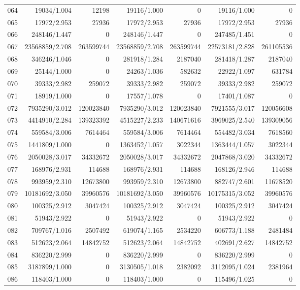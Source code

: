 \begin{longtable}{crrrrrr}
064 & 19034/1.004 & 12198 & 19116/1.000 & 0 & 19116/1.000 & 0 \\
065 & 17972/2.953 & 27936 & 17972/2.953 & 27936 & 17972/2.953 & 27936 \\
066 & 248146/1.447 & 0 & 248146/1.447 & 0 & 247485/1.451 & 0 \\
067 & 23568859/2.708 & 263599744 & 23568859/2.708 & 263599744 & 22573181/2.828 & 261105536 \\
068 & 346246/1.046 & 0 & 281918/1.284 & 2187040 & 281418/1.287 & 2187040 \\
069 & 25144/1.000 & 0 & 24263/1.036 & 582632 & 22922/1.097 & 631784 \\
070 & 39333/2.982 & 259072 & 39333/2.982 & 259072 & 39333/2.982 & 259072 \\
071 & 18919/1.000 & 0 & 17557/1.078 & 0 & 17401/1.087 & 0 \\
072 & 7935290/3.012 & 120023840 & 7935290/3.012 & 120023840 & 7921555/3.017 & 120056608 \\
073 & 4414910/2.284 & 139323392 & 4515227/2.233 & 140671616 & 3969025/2.540 & 139309056 \\
074 & 559584/3.006 & 7614464 & 559584/3.006 & 7614464 & 554482/3.034 & 7618560 \\
075 & 1441809/1.000 & 0 & 1363452/1.057 & 3022344 & 1363444/1.057 & 3022344 \\
076 & 2050028/3.017 & 34332672 & 2050028/3.017 & 34332672 & 2047868/3.020 & 34332672 \\
077 & 168976/2.931 & 114688 & 168976/2.931 & 114688 & 168126/2.946 & 114688 \\
078 & 993959/2.310 & 12673800 & 993959/2.310 & 12673800 & 882747/2.601 & 11678520 \\
079 & 10181692/3.050 & 39960576 & 10181692/3.050 & 39960576 & 10175315/3.052 & 39960576 \\
080 & 100325/2.912 & 3047424 & 100325/2.912 & 3047424 & 100325/2.912 & 3047424 \\
081 & 51943/2.922 & 0 & 51943/2.922 & 0 & 51943/2.922 & 0 \\
082 & 709767/1.016 & 2507492 & 619074/1.165 & 2534220 & 606773/1.188 & 2481484 \\
083 & 512623/2.064 & 14842752 & 512623/2.064 & 14842752 & 402691/2.627 & 14842752 \\
084 & 836220/2.999 & 0 & 836220/2.999 & 0 & 836220/2.999 & 0 \\
085 & 3187899/1.000 & 0 & 3130505/1.018 & 2382092 & 3112095/1.024 & 2381964 \\
086 & 118403/1.000 & 0 & 118403/1.000 & 0 & 115496/1.025 & 0 \\

\end{longtable}

